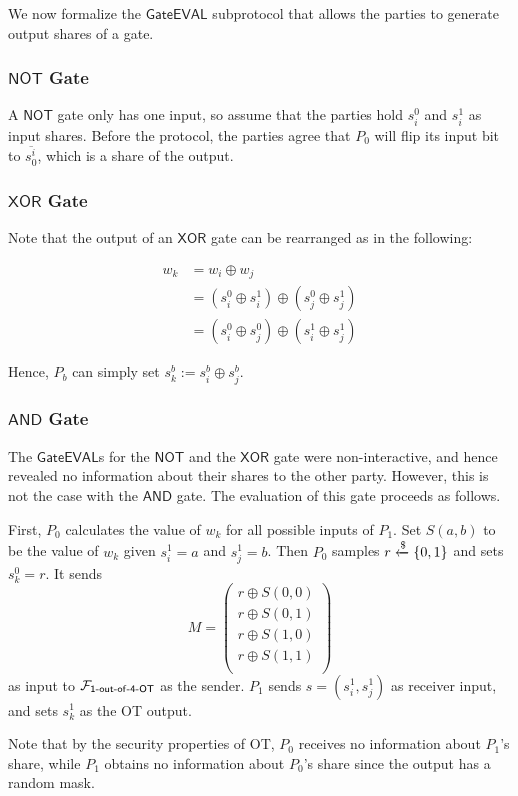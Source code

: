 We now formalize the $\mathsf{GateEVAL}$ subprotocol that allows the parties to generate output shares of a gate.

\subsubsection{$\mathsf{NOT}$ Gate}

A $\mathsf{NOT}$ gate only has one input, so assume that the parties hold $s^0_i$ and $s^1_i$ as input shares. Before the protocol, the parties agree that $P_0$ will flip its input bit to $\overline{s^i_0}$, which is a share of the output.

\subsubsection{$\mathsf{XOR}$ Gate}

Note that the output of an $\mathsf{XOR}$ gate can be rearranged as in the following:

\begin{align*}
	w_k &= w_i\oplus w_j\\
		&= (s^0_i\oplus s^1_i)\oplus (s^0_j\oplus s^1_j)\\
		&=(s^0_i\oplus s^0_j)\oplus (s^1_i\oplus s^1_j)
\end{align*}

Hence, $P_b$ can simply set $s^b_k:=s^b_i\oplus s^b_j$. 

\subsubsection{$\mathsf{AND}$ Gate}

The $\mathsf{GateEVAL}$s for the $\mathsf{NOT}$ and the $\mathsf{XOR}$ gate were non-interactive, and hence revealed no information about their shares to the other party. However, this is not the case with the $\mathsf{AND}$ gate. The evaluation of this gate proceeds as follows. 

First, $P_0$ calculates the value of $w_k$ for all possible inputs of $P_1$. Set $S(a,b)$ to be the value of $w_k$ given $s^1_i = a$ and $s^1_j=b$. Then $P_0$ samples $r\xleftarrow{\$}\{0,1\}$ and sets $s^0_k=r$. It sends 
$$M=\begin{pmatrix}
	r\oplus S(0,0)\\
	r\oplus S(0,1)\\
	r\oplus S(1,0)\\
	r\oplus S(1,1)\\
\end{pmatrix}$$
as input to $\mathcal{F}_\mathsf{1\text{-}out\text{-}of\text{-}4\text{-}OT}$ as the sender. $P_1$ sends $s=(s^1_i, s^1_j)$ as receiver input, and sets $s^1_k$ as the OT output.

Note that by the security properties of OT, $P_0$ receives no information about $P_1$'s share, while $P_1$ obtains no information about $P_0$'s share since the output has a random mask.